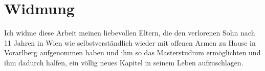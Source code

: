\documentclass[Bachelorarbeit.tex]{subfiles}
\begin{document}
\chapter*{Widmung}
Ich widme diese Arbeit meinen liebevollen Eltern, die den verlorenen Sohn nach 11 Jahren in Wien wie selbstverständlich wieder mit offenen Armen zu Hause in Vorarlberg aufgenommen haben und ihm so das Masterstudium ermöglichten und ihm dadurch halfen, ein völlig neues Kapitel in seinem Leben aufzuschlagen.
\end{document}
